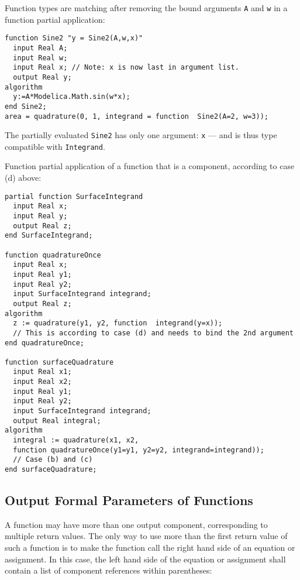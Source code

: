 \begin{example}
Function types are matching after removing the bound arguments \lstinline!A! and \lstinline!w! in a function partial
application:
\begin{lstlisting}[language=modelica]
  function Sine2 "y = Sine2(A,w,x)"
  input Real A;
  input Real w;
  input Real x; // Note: x is now last in argument list.
  output Real y;
algorithm
  y:=A*Modelica.Math.sin(w*x);
end Sine2;
area = quadrature(0, 1, integrand = function  Sine2(A=2, w=3));
\end{lstlisting}
The partially evaluated \lstinline!Sine2! has only one argument: \lstinline!x! ---
and is thus type compatible with \lstinline!Integrand!.
\end{example}

\begin{example}
Function partial application of a function that is a component, according to case (d) above:
\begin{lstlisting}[language=modelica]
partial function SurfaceIntegrand
  input Real x;
  input Real y;
  output Real z;
end SurfaceIntegrand;

function quadratureOnce
  input Real x;
  input Real y1;
  input Real y2;
  input SurfaceIntegrand integrand;
  output Real z;
algorithm
  z := quadrature(y1, y2, function  integrand(y=x));
  // This is according to case (d) and needs to bind the 2nd argument
end quadratureOnce;

function surfaceQuadrature
  input Real x1;
  input Real x2;
  input Real y1;
  input Real y2;
  input SurfaceIntegrand integrand;
  output Real integral;
algorithm
  integral := quadrature(x1, x2,
  function quadratureOnce(y1=y1, y2=y2, integrand=integrand));
  // Case (b) and (c)
end surfaceQuadrature;
\end{lstlisting}
\end{example}

\subsection{Output Formal Parameters of Functions}

A function may have more than one output component, corresponding to
multiple return values. The only way to use more than the first return
value of such a function is to make the function call the right hand
side of an equation or assignment. In this case, the left hand side of
the equation or assignment shall contain a list of component references
within parentheses:

